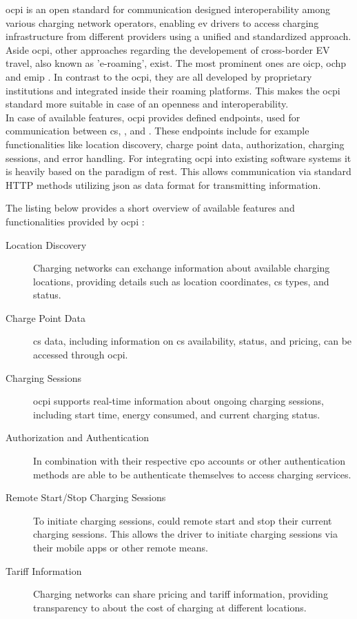 \acrfull{ocpi} is an open standard for communication designed interoperability among various charging network operators, enabling \acrshort{ev} drivers to access charging infrastructure from different providers using a unified and standardized approach. 
Aside \acrshort{ocpi}, other approaches regarding the developement of cross-border EV travel, also known as 'e-roaming', exist. 
The most prominent ones are \acrfull{oicp}, \acrfull{ochp} and \acrfull{emip} \cite{ferwerda_advancing_2018}. 
In contrast to the \acrshort{ocpi}, they are all developed by proprietary institutions and integrated inside their roaming platforms.
This makes the \acrshort{ocpi} standard more suitable in case of an openness and interoperability. \\
\noindent In case of available features, \acrshort{ocpi} provides defined endpoints, used for communication between \acrshort{cs}, ,  and . These endpoints include for example functionalities like location discovery, charge point data, authorization, charging sessions, and error handling. 
For integrating \acrshort{ocpi} into existing software systems it is heavily based on the paradigm of \acrfull{rest}. This allows communication via standard HTTP methods utilizing \acrfull{json} as data format for transmitting information. 

The listing below provides a short overview of available features and functionalities provided by \acrshort{ocpi} \cite{noauthor_ocpiocpi_2023}:

\begin{description}
    \item[Location Discovery] Charging networks can exchange information about available charging locations, providing details such as location coordinates, \acrshort{cs} types, and status.
    \item[Charge Point Data] \acrshort{cs} data, including information on \acrshort{cs} availability, status, and pricing, can be accessed through \acrshort{ocpi}.
    \item[Charging Sessions] \acrshort{ocpi} supports real-time information about ongoing charging sessions, including start time, energy consumed, and current charging status.
    \item[Authorization and Authentication] In combination with their respective \acrshort{cpo} accounts or other authentication methods  are able to be authenticate themselves to access charging services.
    \item[Remote Start/Stop Charging Sessions] To initiate charging sessions,  could remote start and stop their current charging sessions. This allows the driver to initiate charging sessions via their mobile apps or other remote means.
    \item[Tariff Information] Charging networks can share pricing and tariff information, providing transparency to  about the cost of charging at different locations.
\end{description}

